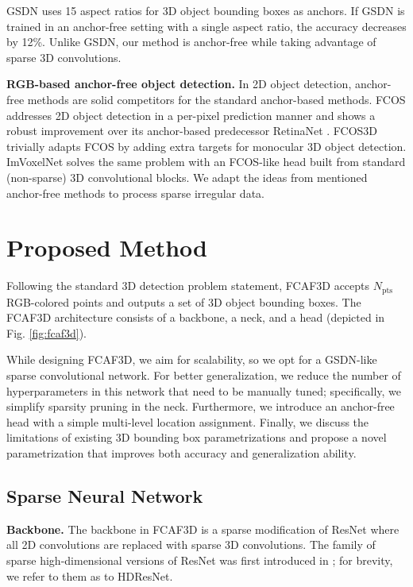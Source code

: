 \documentclass[runningheads]{llncs}
\begin{document}
GSDN uses 15 aspect ratios for 3D object bounding boxes as anchors. If GSDN is trained in an anchor-free setting with a single aspect ratio, the accuracy decreases by 12\%. Unlike GSDN, our method is anchor-free while taking advantage of sparse 3D convolutions.

\textbf{RGB-based anchor-free object detection.} In 2D object detection, anchor-free methods are solid competitors for the standard anchor-based methods. FCOS \cite{tian2019fcos} addresses 2D object detection in a per-pixel prediction manner and shows a robust improvement over its anchor-based predecessor RetinaNet \cite{lin2017retinanet}. FCOS3D \cite{wang2021fcos3d} trivially adapts FCOS by adding extra targets for monocular 3D object detection. ImVoxelNet \cite{rukhovich2021imvoxelnet} solves the same problem with an FCOS-like head built from standard (non-sparse) 3D convolutional blocks. We adapt the ideas from mentioned anchor-free methods to process sparse irregular data.

\section{Proposed Method}

Following the standard 3D detection problem statement, FCAF3D accepts $N_{\text{pts}}$ RGB-colored points and outputs a set of 3D object bounding boxes. The FCAF3D architecture consists of a backbone, a neck, and a head (depicted in Fig. \ref{fig:fcaf3d}).

While designing FCAF3D, we aim for scalability, so we opt for a GSDN-like sparse convolutional network. For better generalization, we reduce the number of hyperparameters in this network that need to be manually tuned; specifically, we simplify sparsity pruning in the neck. Furthermore, we introduce an anchor-free head with a simple multi-level location assignment. Finally, we discuss the limitations of existing 3D bounding box parametrizations and propose a novel parametrization that improves both accuracy and generalization ability.

\subsection{Sparse Neural Network}

\textbf{Backbone.} The backbone in FCAF3D is a sparse modification of ResNet \cite{he2016resnet} where all 2D convolutions are replaced with sparse 3D convolutions. The family of sparse high-dimensional versions of ResNet was first introduced in \cite{choy2019minkowski}; for brevity, we refer to them as to HDResNet. %
\end{document}

